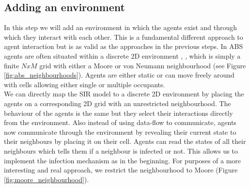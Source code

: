 \subsection{Adding an environment}
\label{sec:step5_environment}
In this step we will add an environment in which the agents exist and through which they interact with each other. This is a fundamental different approach to agent interaction but is as valid as the approaches in the previous steps.
In ABS agents are often situated within a discrete 2D environment \cite{schelling_dynamic_1971}, \cite{epstein_growing_1996}, \cite{epstein_agent_zero:_2014} which is simply a finite $N x M$ grid with either a Moore or von Neumann neighbourhood (see Figure \ref{fig:abs_neighbourhoods}). Agents are either static or can move freely around with cells allowing either single or multiple occupants. \\
We can directly map the SIR model to a discrete 2D environment by placing the agents on a corresponding 2D grid with an unrestricted neighbourhood. The behaviour of the agents is the same but they select their interactions directly from the environment. Also instead of using data-flow to communicate, agents now communicate through the environment by revealing their current state to their neighbours by placing it on their cell. Agents can read the states of all their neighbours which tells them if a neighbour is infected or not. This allows us to implement the infection mechanism as in the beginning. For purposes of a more interesting and real approach, we restrict the neighbourhood to Moore (Figure \ref{fig:moore_neighbourhood}).

